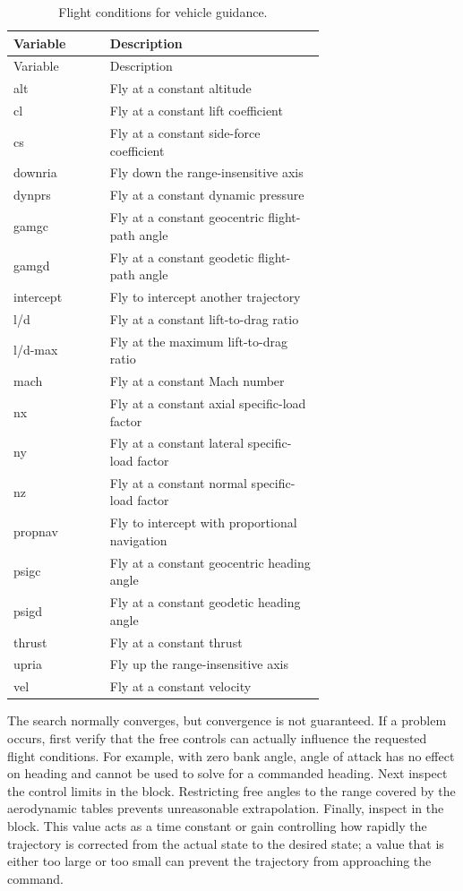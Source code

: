 \begin{longtable}{@{}>{\ttfamily}lp{0.69\linewidth}@{}}
  \caption{Flight conditions for vehicle guidance.}\label{tab:flight-condition-guidance}\\
  \toprule
  \normalfont Variable & Description \\
  \midrule
  \endfirsthead
  \toprule
  \normalfont Variable & Description \\
  \midrule
  \endhead
  alt       & Fly at a constant altitude \\
  cl        & Fly at a constant lift coefficient \\
  cs        & Fly at a constant side-force coefficient \\
  downria   & Fly down the range-insensitive axis \\
  dynprs    & Fly at a constant dynamic pressure \\
  gamgc     & Fly at a constant geocentric flight-path angle \\
  gamgd     & Fly at a constant geodetic flight-path angle \\
  intercept & Fly to intercept another trajectory \\
  l/d       & Fly at a constant lift-to-drag ratio \\
  l/d-max   & Fly at the maximum lift-to-drag ratio \\
  mach      & Fly at a constant Mach number \\
  nx        & Fly at a constant axial specific-load factor \\
  ny        & Fly at a constant lateral specific-load factor \\
  nz        & Fly at a constant normal specific-load factor \\
  propnav   & Fly to intercept with proportional navigation \\
  psigc     & Fly at a constant geocentric heading angle \\
  psigd     & Fly at a constant geodetic heading angle \\
  thrust    & Fly at a constant thrust \\
  upria     & Fly up the range-insensitive axis \\
  vel       & Fly at a constant velocity \\
  \bottomrule
\end{longtable}

The search normally converges, but convergence is not guaranteed. If a problem
occurs, first verify that the free controls can actually influence the requested flight
conditions. For example, with zero bank angle, angle of attack has no effect on
heading and cannot be used to solve for a commanded heading. Next inspect the
control limits in the  block. Restricting free angles to the
range covered by the aerodynamic tables prevents unreasonable extrapolation. Finally,
inspect  in the  block. This value acts as a
time constant or gain controlling how rapidly the trajectory is corrected from the
actual state to the desired state; a value that is either too large or too small can
prevent the trajectory from approaching the command.

